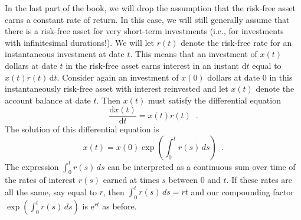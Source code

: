 In the last part of the book, we will drop the assumption that the risk-free asset earns a constant rate of return.  In this case, we will still generally assume that there is a risk-free asset for very short-term investments (i.e., for investments with infinitesimal durations!).  We will let $r(t)$ denote the risk-free rate for an instantaneous investment at date $t$. This means that an investment of $x(t)$ dollars at date $t$ in the risk-free asset earns interest in an instant $\mathrm{d} t$ equal to $x(t)r(t)\,\mathrm{d} t$.  Consider again an investment of $x(0)$ dollars at date 0 in this instantaneously risk-free asset with interest reinvested and let $x(t)$ denote the account balance at date $t$.  Then $x(t)$ must satisfy the differential equation
$$\frac{\mathrm{d} x(t)}{\mathrm{d} t} = x(t)r(t)\;\;.$$
The solution of this differential equation is
$$x(t) = x(0)\exp\left(\int_0^t r(s)\,ds\right)\;\;.$$
The expression $\int_0^t r(s)\,ds$ can be interpreted as a continuous sum over time of the rates of interest $r(s)$ earned at times $s$ between 0 and $t$.  If these rates are all the same, say equal to $r$, then $\int_0^t r(s)\,ds = rt$ and our compounding factor $\exp\left(\int_0^t r(s)\,ds\right)$ is $\mathrm{e}^{rt}$ as before.  
